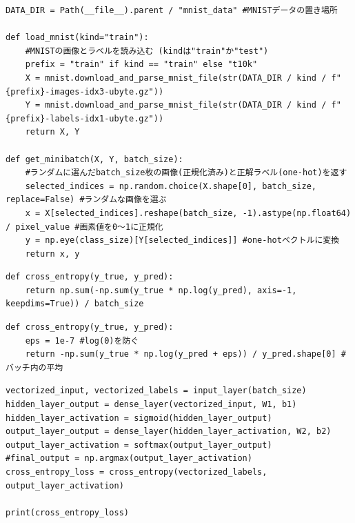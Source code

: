 \documentclass[a4paper,11pt]{ltjsarticle}
\begin{document}
\begin{lstlisting}[style=after, caption={【後】読み込みとミニバッチの選択を別の関数に分割}, label=lst:k2a1]
DATA_DIR = Path(__file__).parent / "mnist_data" #MNISTデータの置き場所

def load_mnist(kind="train"):
    #MNISTの画像とラベルを読み込む (kindは"train"か"test")
    prefix = "train" if kind == "train" else "t10k"
    X = mnist.download_and_parse_mnist_file(str(DATA_DIR / kind / f"{prefix}-images-idx3-ubyte.gz"))
    Y = mnist.download_and_parse_mnist_file(str(DATA_DIR / kind / f"{prefix}-labels-idx1-ubyte.gz"))
    return X, Y

def get_minibatch(X, Y, batch_size):
    #ランダムに選んだbatch_size枚の画像(正規化済み)と正解ラベル(one-hot)を返す
    selected_indices = np.random.choice(X.shape[0], batch_size, replace=False) #ランダムな画像を選ぶ
    x = X[selected_indices].reshape(batch_size, -1).astype(np.float64) / pixel_value #画素値を0〜1に正規化
    y = np.eye(class_size)[Y[selected_indices]] #one-hotベクトルに変換
    return x, y
\end{lstlisting}

\begin{lstlisting}[style=before, caption={【前】グローバル変数に依存したクロスエントロピー誤差}, label=lst:k2b2]
def cross_entropy(y_true, y_pred):
    return np.sum(-np.sum(y_true * np.log(y_pred), axis=-1, keepdims=True)) / batch_size
\end{lstlisting}

\begin{lstlisting}[style=after, caption={【後】入力から枚数を求め、log(0)を防ぐ}, label=lst:k2a2]
def cross_entropy(y_true, y_pred):
    eps = 1e-7 #log(0)を防ぐ
    return -np.sum(y_true * np.log(y_pred + eps)) / y_pred.shape[0] #バッチ内の平均
\end{lstlisting}

\begin{lstlisting}[style=before, caption={【前】実行部分がファイルの最上位に書かれている}, label=lst:k2b3]
vectorized_input, vectorized_labels = input_layer(batch_size)
hidden_layer_output = dense_layer(vectorized_input, W1, b1)
hidden_layer_activation = sigmoid(hidden_layer_output)
output_layer_output = dense_layer(hidden_layer_activation, W2, b2)
output_layer_activation = softmax(output_layer_output)
#final_output = np.argmax(output_layer_activation)
cross_entropy_loss = cross_entropy(vectorized_labels, output_layer_activation)

print(cross_entropy_loss)
\end{lstlisting}
\end{document}
